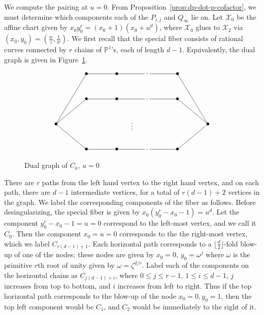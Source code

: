 \documentclass[reqno]{amsart}
\theoremstyle{definition}
\theoremstyle{remark}
\def\XX{\mathcal{X}}
\def\Pro{\ensuremath{\mathbb{P}}}
\begin{document}
We compute the pairing at $u = 0$. From Proposition~\ref{prop:dp-dot-p-cofactor}, we must determine which components each of the $P_{i,j}$ and $Q_\infty$ lie on. Let $\XX_0$ be the affine chart given by $x_0 y_0^r = (x_0+1)(x_0+u^d)$, where $\XX_0$ glues to $\XX_2$ via $(x_0, y_0) = (\frac{w}{z}, \frac{1}{w})$. We first recall that the special fiber consists of rational curves connected by $r$ chains of $\Pro^1$'s, each of length $d-1$. Equivalently, the dual graph is given in Figure~\ref{fig:u-equals-zero}.
\begin{figure}[h]\centering
  \[
\xygraph{
  !{<0cm,0cm>;<1.5cm,0cm>:<0cm,1.25cm>::}
  !{(0, 2) }*{\bullet}="c0"
  !{(5, 2) }*{\bullet}="clast"
  !{(1, 4) }*{\bullet}="c11"
  !{(2, 4) }*{\bullet}="c12"
  !{(3, 4) }*{\dots}="c1dots"
  !{(4, 4) }*{\bullet}="c1last"
  !{(1, 3) }*{\bullet}="c21"
  !{(2, 3) }*{\bullet}="c22"
  !{(3, 3) }*{\dots}="c2dots"
  !{(4, 3) }*{\bullet}="c2last"
  !{(2.5, 2) }*{\vdots}
  !{(1, 1) }*{\bullet}="cr1"
  !{(2, 1) }*{\bullet}="cr2"
  !{(3, 1) }*{\dots}="crdots"
  !{(4, 1) }*{\bullet}="crlast"
  "c0"-"c11"
  "c11"-"c12"
  "c12"-"c1dots"
  "c1dots"-"c1last"
  "c1last"-"clast"
  "c0"-"c21"
  "c21"-"c22"
  "c22"-"c2dots"
  "c2dots"-"c2last"
  "c2last"-"clast"
  "c0"-"cr1"
  "cr1"-"cr2"
  "cr2"-"crdots"
  "crdots"-"crlast"
  "crlast"-"clast"
}
\]
  \caption{Dual graph of $C_k$, $u=0$}
\label{fig:u-equals-zero}
\end{figure}
There are $r$ paths from the left hand vertex to the right hand vertex, and on each path, there are $d-1$ intermediate vertices, for a total of $r(d-1) + 2$ vertices in the graph. We label the corresponding components of the fiber as follows. Before desingularizing, the special fiber is given by $x_0(y_0^r - x_0 - 1) = u^d$. Let the component $y_0^r - x_0 - 1 = u = 0$ correspond to the left-most vertex, and we call it $C_0$. Then the component $x_0 = u = 0$ corresponds to the the right-most vertex, which we label $C_{r(d-1)+1}$. Each horizontal path corresponds to a $\lfloor \frac{d}{2}\rfloor$-fold blow-up of one of the nodes; these nodes are given by $x_0 = 0$, $y_0 = \omega^j$ where $\omega$ is the primitive $r$th root of unity given by $\omega = \zeta^{d/r}$. Label each of the components on the horizontal chains as $C_{j(d-1) + i}$, where $0 \leq j \leq r-1$, $1 \leq i \leq d-1$, $j$ increases from top to bottom, and $i$ increases from left to right. Thus if the top horizontal path corresponds to the blow-up of the node $x_0 = 0, y_0 = 1$, then the top left component would be $C_1$, and $C_2$ would be immediately to the right of it.
\end{document}
